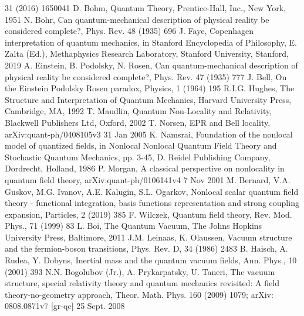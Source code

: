 \documentclass[12pt]{iopart}
\begin{document}
\begin{thebibliography}{}
                    31 (2016) 1650041
 D. Bohm, Quantum Theory, Prentice-Hall, Inc., New York, 1951
 N. Bohr, Can quantum-mechanical description of physical reality be considered
                   complete?, Phys. Rev. 48 (1935) 696
 J. Faye, Copenhagen interpretation of quantum mechanics, in Stanford 
                   Encyclopedia of Philosophy, E. Zalta (Ed.), Methaphysics Research Laboratory, 
                   Stanford University, Stanford, 2019   
 A. Einstein, B. Podolsky, N. Rosen, Can quantum-mechanical description of 
                   physical reality be considered complete?, Phys. Rev. 47 (1935) 777   
 J. Bell, On the Einstein Podolsky Rosen paradox, Physics, 1 (1964) 195 
 R.I.G. Hughes, The Structure and Interpretation of Quantum Mechanics,
                   Harvard University Press, Cambridge, MA, 1992
 T. Maudlin, Quantum Non-Locality and Relativity, Blackwell Publishers Ltd, 
                   Oxford, 2002
 T. Norsen, EPR and Bell locality, arXiv:quant-ph/0408105v3  31 Jan 2005
 K. Namsrai, Foundation of the nonlocal model of quantized fields, in
                   Nonlocal Nonlocal Quantum Field Theory and Stochastic Quantum Mechanics,
                   pp. 3-45, D. Reidel Publishing Company, Dordrecht, Holland, 1986
 P. Morgan, A classical perspective on nonlocality in quantum field theory,
                   arXiv:quant-ph/0106141v4  7 Nov 2001
 M. Bernard, V.A. Guskov, M.G. Ivanov, A.E. Kalugin, S.L. Ogarkov, Nonlocal
                   scalar quantum field theory - functional integration, basis functions representation
                   and strong coupling expansion, Particles, 2 (2019) 385   
 F. Wilczek, Quantum field theory, Rev. Mod. Phys., 71 (1999) 83 
 L. Boi, The Quantum Vacuum, The Johns Hopkins University Press, 
                    Baltimore, 2011  
 J.M. Leinaas, K. Olaussen, Vacuum structure and the fermion-boson transitions,
                    Phys. Rev. D, 34 (1986) 2483      
 B. Haisch, A. Rudea, Y. Dobyns, Inertial mass and the quantum vacuum fields,
                    Ann. Phys., 10 (2001) 393  
 N.N. Bogolubov (Jr.), A. Prykarpatsky, U. Taneri, The vacuum structure, special 
                   relativity theory and quantum mechanics revisited: A field theory-no-geometry approach,
                   Theor. Math. Phys. 160 (2009) 1079; arXiv: 0808.0871v7 [gr-qc]  25 Sept. 2008      
\end{thebibliography}
\end{document}
